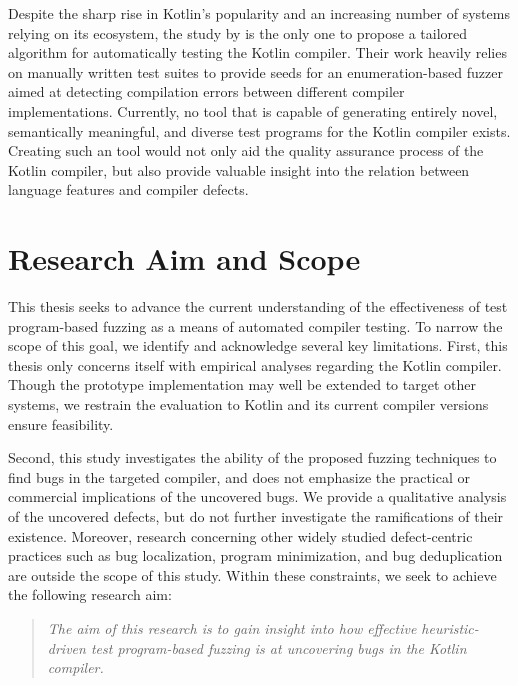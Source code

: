 Despite the sharp rise in Kotlin's popularity and an increasing
number of systems relying on its ecosystem, the study by \citet{stepanov2021type}
is the only one to propose a tailored algorithm for automatically 
testing the Kotlin compiler.
Their work heavily relies on manually written test suites to 
provide seeds for an enumeration-based fuzzer aimed at detecting compilation
errors between different compiler implementations. 
Currently, no tool that is capable of generating entirely novel, semantically 
meaningful, and diverse test programs for the Kotlin compiler exists.
Creating such an tool would not only aid the quality assurance process
of the Kotlin compiler, but also provide valuable insight 
into the relation between language features and compiler defects.

\section{\label{sec:aim}Research Aim and Scope}

This thesis seeks to advance the current understanding of the
effectiveness of test program-based fuzzing as a means of automated compiler testing.
To narrow the scope of this goal, we identify and acknowledge several
key limitations.
First, this thesis only concerns itself with empirical analyses regarding
the Kotlin compiler. 
Though the prototype implementation may well be 
extended to target other systems, we restrain the
evaluation to Kotlin and its current compiler versions ensure feasibility.

Second, this study investigates the ability of the proposed fuzzing
techniques to find bugs in the targeted compiler, and does not emphasize
the practical or commercial implications of the uncovered bugs.
We provide a qualitative analysis of the uncovered defects, but do
not further investigate the ramifications of their existence.
Moreover, research concerning other widely studied defect-centric 
practices such as bug localization, program minimization, and bug deduplication
are outside the scope of this study.
Within these constraints, we seek to achieve the following research aim:

\begin{quote}
\centering 
\emph{The aim of this research is to gain insight into how 
effective heuristic-driven 
test program-based fuzzing is at uncovering bugs in the
Kotlin compiler.}
\end{quote}

